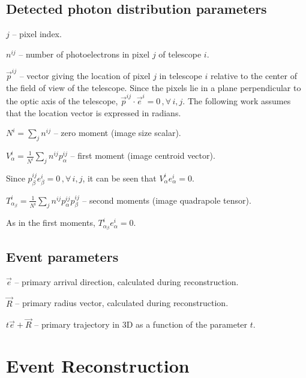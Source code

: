 \documentclass[letterpaper]{article}
\begin{document}
\subsection{Detected photon distribution parameters}

$\displaystyle j$ -- pixel index.

$\displaystyle n^{ij}$ -- number of photoelectrons in pixel $j$ of 
telescope $i$.

$\displaystyle \vec{p}^{ij}$ -- vector giving the location of pixel
$j$ in telescope $i$ relative to the center of the field of view of
the telescope. Since the pixels lie in a plane perpendicular to the
optic axis of the telescope, $\vec{p}^{ij}\cdot\vec{e}^i=0\,,\forall\,
i,j$. The following work assumes that the location vector is expressed
in radians.

$\displaystyle N^{i}=\sum\limits_{j}n^{ij}$ -- zero moment (image
size scalar).

$\displaystyle V_{\alpha }^{i}=
\frac{1}{N^{i}}\sum\limits_{j}n^{ij}p_{\alpha }^{ij}$ --
first moment (image centroid vector).

Since $p_{\beta}^{ij}e_{\beta}^{i}=0\,,\forall\,i,j$, it can be seen
that $V_{\alpha}^{i}e_{\alpha }^{i}=0$.

$\displaystyle T_{\alpha_{\beta }}^{i}=
\frac{1}{N^{i}}\sum\limits_{j}n^{ij}p_{\alpha}^{ij}p_{\beta }^{ij}$  --
second moments (image quadrapole tensor). 

As in the first moments, $T_{\alpha_{\beta}}^{i}e_{\alpha }^{i}=0$.

\subsection{Event parameters}

$\displaystyle \vec{e}$ -- primary arrival direction, calculated during
reconstruction.

$\displaystyle \vec{R}$ -- primary radius vector, calculated during
reconstruction.

$\displaystyle t\vec{e}+\vec{R}$ -- primary trajectory in 3D as a 
function of the parameter $t$.

\section{Event Reconstruction}
\end{document}

